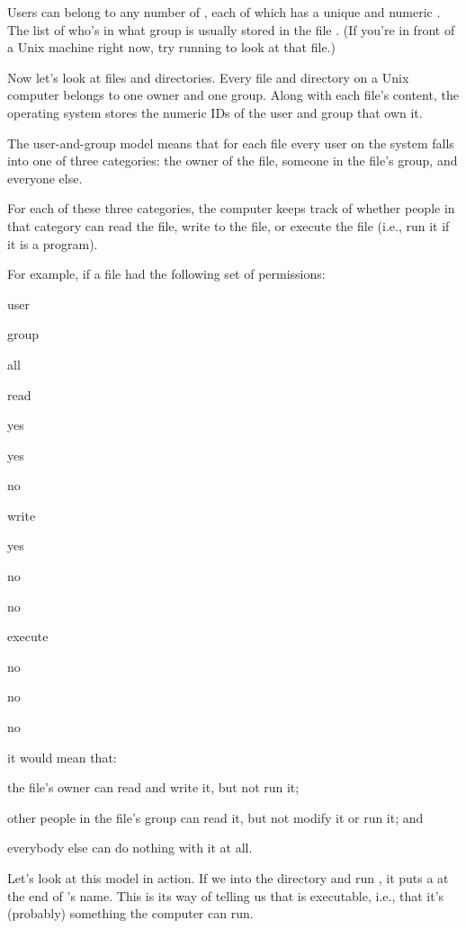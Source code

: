 Users can belong to any number of , each
of which has a unique  and
numeric . The list of who's in what
group is usually stored in the file . (If you're in
front of a Unix machine right now, try running 
to look at that file.)

Now let's look at files and directories. Every file and directory on a
Unix computer belongs to one owner and one group. Along with each file's
content, the operating system stores the numeric IDs of the user and
group that own it.

The user-and-group model means that for each file every user on the
system falls into one of three categories: the owner of the file,
someone in the file's group, and everyone else.

For each of these three categories, the computer keeps track of whether
people in that category can read the file, write to the file, or execute
the file (i.e., run it if it is a program).

For example, if a file had the following set of permissions:

user

group

all

read

yes

yes

no

write

yes

no

no

execute

no

no

no

it would mean that:

\begin{swcitemize}
\item
  the file's owner can read and write it, but not run it;
\item
  other people in the file's group can read it, but not modify it or run
  it; and
\item
  everybody else can do nothing with it at all.
\end{swcitemize}

Let's look at this model in action. If we  into the
 directory and run , it puts a \code{*} at
the end of 's name. This is its way of telling us that
 is executable, i.e., that it's (probably) something the
computer can run.

